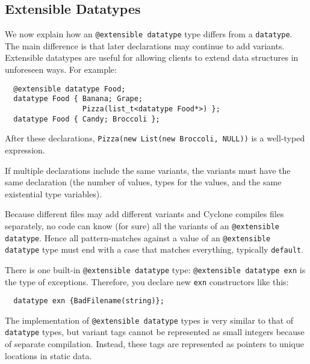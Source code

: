 \subsection{Extensible Datatypes}\hypertarget{xdatatype_sec}{}

We now explain how an \texttt{@extensible datatype} type differs 
from a \texttt{datatype}.
The main difference is that later declarations may continue to
add variants.  Extensible datatypes are useful for allowing clients to
extend data structures in unforeseen ways.  For example:
\begin{verbatim}
  @extensible datatype Food;
  datatype Food { Banana; Grape; 
                  Pizza(list_t<datatype Food*>) };
  datatype Food { Candy; Broccoli };
\end{verbatim}

After these declarations, \texttt{Pizza(new List(new Broccoli, NULL))} is a
well-typed expression.

If multiple declarations include the same variants, the variants must
have the same declaration (the number of values, types for the values,
and the same existential type variables).

Because different files may add different variants and Cyclone
compiles files separately, no code can know (for sure) all the
variants of an \texttt{@extensible datatype}. 
Hence all pattern-matches against a
value of an \texttt{@extensible datatype} 
type must end with a case that matches
everything, typically \texttt{default}.

There is one built-in \texttt{@extensible datatype} type: 
\texttt{@extensible datatype exn} is the
type of exceptions.  Therefore, you declare new \texttt{exn}
constructors like this:

\begin{verbatim}
  datatype exn {BadFilename(string)};
\end{verbatim}

The implementation of \texttt{@extensible datatype} 
types is very similar to that of
\texttt{datatype} types, but variant tags cannot be represented as
small integers because of separate compilation.  Instead, these
tags are represented as pointers to unique locations in static
data. 

